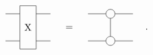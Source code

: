 \begin{equation}
    \vcenter{\hbox{  \begin{tikzpicture}[baseline=0.5]

                \def \legLength { 0.8}
                \def \radius {0.1}

                \pgfmathsetmacro{\step}{2*\radius+ \legLength} %
                \pgfmathsetmacro{\legpos}{\radius+\legLength} %

                \node[draw=none, circle,radius=\radius] (L0) at (-1,0) {};
                \node[draw=none, circle,radius=\radius] (L1) at (-1,1) {};

                \draw (-0.3,1.3) -- (0.3,1.3) -- (0.3,-0.3) -- (-0.3,-0.3) -- cycle;

                \node[draw=none, circle,radius=\radius] (R0) at (1,0) {};
                \node[draw=none, circle,radius=\radius] (R1) at (1,1) {};

                \draw (L0) --   (-0.3,0);
                \draw (L1) --   (-0.3,1);

                \draw (R0) --   (0.3,0);
                \draw (R1) --   (0.3,1);

                \node[draw=none] (C0) at (0,0.5) {X};
            \end{tikzpicture} }} =  \vcenter{\hbox{  \begin{tikzpicture}[baseline=0.5]

                \def \legLength { 0.8}
                \def \radius {0.1}

                \pgfmathsetmacro{\step}{2*\radius+ \legLength} %
                \pgfmathsetmacro{\legpos}{\radius+\legLength} %

                \node[draw=none, circle,radius=\radius] (L0) at (-1,0) {};
                \node[draw=none, circle,radius=\radius] (L1) at (-1,1) {};

                \node[draw, circle,radius=\radius] (C0) at (0,0) {};
                \node[draw, circle,radius=\radius] (C1) at (0,1) {};

                \node[draw=none, circle,radius=\radius] (R0) at (1,0) {};
                \node[draw=none, circle,radius=\radius] (R1) at (1,1) {};

                \draw (L0) --   (C0);
                \draw (L1) --   (C1);

                \draw (R0) --   (C0);
                \draw (R1) --   (C1);

                \draw (C1) --   (C0);

            \end{tikzpicture} }} .
\end{equation}
